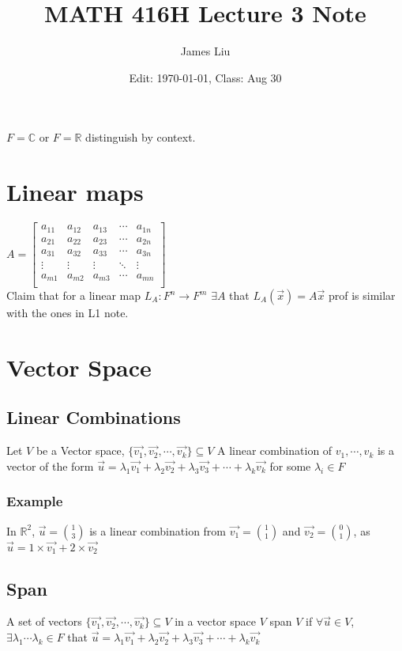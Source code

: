 \documentclass{article}
\date{Edit: \today, Class: Aug 30}
\title{MATH 416H Lecture 3 Note}
\author{James Liu}
\begin{document}
\maketitle
\(F=\mathbb{C}\) or \(F=\mathbb{R}\) distinguish by context.
\section{Linear maps}
\(A=\begin{bmatrix}
    a_{11}&a_{12}&a_{13}&\cdots&a_{1n}\\
    a_{21}&a_{22}&a_{23}&\cdots&a_{2n}\\
    a_{31}&a_{32}&a_{33}&\cdots&a_{3n}\\
    \vdots&\vdots&\vdots&\ddots&\vdots\\
    a_{m1}&a_{m2}&a_{m3}&\cdots&a_{mn}\\
\end{bmatrix}\)
\\
Claim that for a linear map \(L_A:F^n\rightarrow F^m\)  \(\exists A \) that \(L_A(\overrightarrow{x})=A\overrightarrow{x}\)
prof is similar with the ones in L1 note.
\section{Vector Space}
\subsection{Linear Combinations}
Let \(V\) be a Vector space,  \(\{\overrightarrow{v_1},\overrightarrow{v_2},\cdots,\overrightarrow{v_k}\}\subseteq V\)
A linear combination of \(v_1,\cdots,v_k\) is a vector of the form \(\overrightarrow{u}=\lambda_1\overrightarrow{v_1}+\lambda_2\overrightarrow{v_2}+\lambda_3\overrightarrow{v_3}+\cdots+\lambda_k\overrightarrow{v_k}\)
for some \(\lambda_i \in F\)
\subsubsection{Example}
In \(\mathbb{R}^2\), \(\overrightarrow{u}=\binom{1}{3}\) is a linear combination from \(\overrightarrow{v_1}=\binom{1}{1}\) and \(\overrightarrow{v_2}=\binom{0}{1}\),
as \(\overrightarrow{u}=1\times \overrightarrow{v_1}+2\times \overrightarrow{v_2}\)
\subsection{Span}
A set of vectors \(\{\overrightarrow{v_1},\overrightarrow{v_2},\cdots,\overrightarrow{v_k}\}\subseteq V\)
in a vector space \(V\) span \(V\) if \(\forall \overrightarrow{u}\in V\), \(\exists\lambda_1\cdots\lambda_k\in F\) that 
\(\overrightarrow{u}=\lambda_1\overrightarrow{v_1}+\lambda_2\overrightarrow{v_2}+\lambda_3\overrightarrow{v_3}+\cdots+\lambda_k\overrightarrow{v_k}\)
\end{document}
